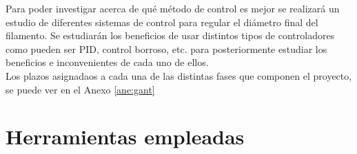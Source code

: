 Para poder investigar acerca de qué método de control es mejor se realizará un estudio de diferentes sistemas de control para regular el diámetro final del filamento. Se estudiarán los beneficios de usar distintos tipos de controladores como pueden ser PID, control borroso, etc. para posteriormente estudiar los beneficios e inconvenientes de cada uno de ellos.\\

Los plazos asignadaos a cada una de las distintas fases que componen el proyecto, se puede ver en el Anexo \ref{ane:gant}

\section{Herramientas empleadas}
\label{sec:herramientas}

